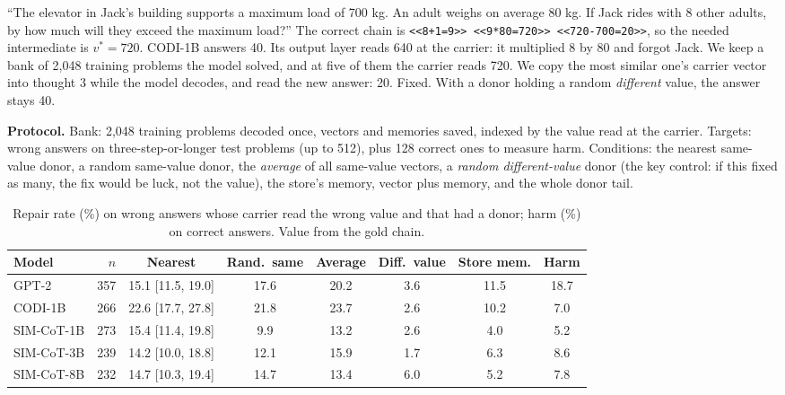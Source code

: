 \documentclass{article}
\begin{document}
\begin{example}
``The elevator in Jack's building supports a maximum load of 700 kg. An adult weighs on average 80 kg. If Jack rides with 8 other adults, by how much will they exceed the maximum load?'' The correct chain is \texttt{<<8+1=9>> <<9*80=720>> <<720-700=20>>}, so the needed intermediate is $v^*=720$. CODI-1B answers 40. Its output layer reads 640 at the carrier: it multiplied 8 by 80 and forgot Jack. We keep a bank of 2,048 training problems the model solved, and at five of them the carrier reads 720. We copy the most similar one's carrier vector into thought 3 while the model decodes, and read the new answer: 20. Fixed. With a donor holding a random \emph{different} value, the answer stays 40.
\end{example}

\textbf{Protocol.} Bank: 2,048 training problems decoded once, vectors and memories saved, indexed by the value read at the carrier. Targets: wrong answers on three-step-or-longer test problems (up to 512), plus 128 correct ones to measure harm. Conditions: the nearest same-value donor, a random same-value donor, the \emph{average} of all same-value vectors, a \emph{random different-value} donor (the key control: if this fixed as many, the fix would be luck, not the value), the store's memory, vector plus memory, and the whole donor tail.

\begin{table}[h]
\caption{Repair rate (\%) on wrong answers whose carrier read the wrong value and that had a donor; harm (\%) on correct answers. Value from the gold chain.}
\label{tab:repair}
\centering\scriptsize
\setlength{\tabcolsep}{3pt}
\begin{tabular}{lrcccccc}
\toprule
Model & $n$ & Nearest & Rand.\ same & Average & Diff.\ value & Store mem. & Harm \\
\midrule
GPT-2 & 357 & 15.1 [11.5, 19.0] & 17.6 & 20.2 & 3.6 & 11.5 & 18.7 \\
CODI-1B & 266 & 22.6 [17.7, 27.8] & 21.8 & 23.7 & 2.6 & 10.2 & 7.0 \\
SIM-CoT-1B & 273 & 15.4 [11.4, 19.8] & 9.9 & 13.2 & 2.6 & 4.0 & 5.2 \\
SIM-CoT-3B & 239 & 14.2 [10.0, 18.8] & 12.1 & 15.9 & 1.7 & 6.3 & 8.6 \\
SIM-CoT-8B & 232 & 14.7 [10.3, 19.4] & 14.7 & 13.4 & 6.0 & 5.2 & 7.8 \\
\bottomrule
\end{tabular}
\end{table}
\end{document}
